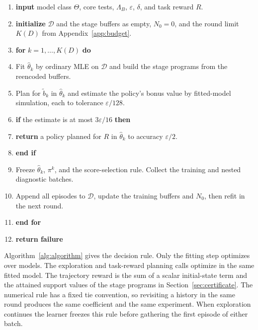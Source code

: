 \documentclass[sigconf,nonacm]{acmart}
\newcommand{\wh}{\widehat}
\newcommand{\eps}{\varepsilon}
\newcommand{\sect}[1]{Section~\ref{#1}}
\begin{document}
\begin{algorithm}[t]
\caption{\textsc{Learning with a Fitted PSR}}
\label{alg:algorithm}
\raggedright
\begin{enumerate}[label=\arabic*:,leftmargin=2em,labelsep=.45em,itemsep=2pt,parsep=0pt,topsep=3pt]
\item \textbf{input} model class $\Theta$, core tests, $\Lambda_B$, $\eps$, $\delta$, and task reward $R$.
\item \textbf{initialize} $\mathcal D$ and the stage buffers as empty, $N_0=0$, and the round limit $K(D)$ from Appendix~\ref{app:budget}.
\item \textbf{for} $k=1,\ldots,K(D)$ \textbf{do}
\item \quad Fit $\wh\theta_k$ by ordinary MLE on $\mathcal D$ and build the stage programs from the reencoded buffers.
\item \quad Plan for $\widetilde b_k$ in $\wh\theta_k$ and estimate the policy's bonus value by fitted-model simulation, each to tolerance $\eps/128$.
\item \quad \textbf{if} the estimate is at most $3\eps/16$ \textbf{then}
\item \qquad \textbf{return} a policy planned for $R$ in $\wh\theta_k$ to accuracy $\eps/2$.
\item \quad \textbf{end if}
\item \quad Freeze $\wh\theta_k$, $\pi^k$, and the score-selection rule. Collect the training and nested diagnostic batches.
\item \quad Append all episodes to $\mathcal D$, update the training buffers and $N_0$, then refit in the next round.
\item \textbf{end for}
\item \textbf{return failure}
\end{enumerate}
\end{algorithm}

Algorithm~\ref{alg:algorithm} gives the decision rule. Only the fitting step optimizes over models. The exploration and task-reward planning calls optimize in the same fitted model. The trajectory reward is the sum of a scalar initial-state term and the attained support values of the stage programs in \sect{sec:certificate}. The numerical rule has a fixed tie convention, so revisiting a history in the same round produces the same coefficient and the same experiment. When exploration continues the learner freezes this rule before gathering the first episode of either batch.
\end{document}
